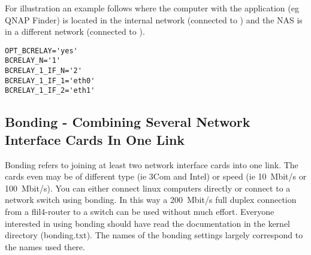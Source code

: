 For illustration an example follows where the computer with the application
(eg QNAP Finder) is located in the internal network (connected to )
and the NAS is in a different network (connected to ).

\begin{example}
\begin{verbatim}
OPT_BCRELAY='yes'
BCRELAY_N='1'
BCRELAY_1_IF_N='2'
BCRELAY_1_IF_1='eth0'
BCRELAY_1_IF_2='eth1'
\end{verbatim}
\end{example}

\subsection{Bonding - Combining Several Network Interface Cards In One Link}

Bonding refers to joining at least two network interface cards into
one link. The cards even may be of different type (ie 3Com and Intel) 
or speed (ie 10~Mbit/s or 100~Mbit/s). You can either connect linux 
computers directly or connect to a network switch using bonding.
In this way a 200~Mbit/s full duplex connection from a flil4-router 
to a switch can be used without much effort.
Everyone interested in using bonding should have read the documentation
in the kernel directory (bonding.txt). The names of the bonding settings
largely correspond to the names used there.

